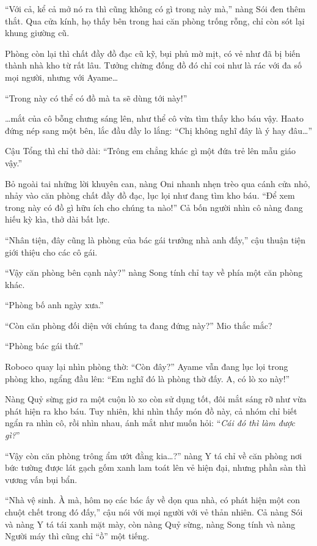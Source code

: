 \documentclass[../main.tex]{subfiles}
\begin{document}
``Với cả, kể cả mở nó ra thì cũng không có gì trong này mà,'' nàng Sói đen thêm thắt. Qua cửa kính, họ thấy bên trong hai căn phòng trống rỗng, chỉ còn sót lại khung giường cũ.

Phòng còn lại thì chất đầy đồ đạc cũ kỹ, bụi phủ mờ mịt, có vẻ như đã bị biến thành nhà kho từ rất lâu. Tưởng chừng đống đồ đó chỉ coi như là rác với đa số mọi người, nhưng với Ayame\dots

``Trong này có thể có đồ mà ta sẽ dùng tới này!''

\dots mắt của cô bỗng chưng sáng lên, như thể cô vừa tìm thấy kho báu vậy. Haato đứng nép sang một bên, lắc đầu đầy lo lắng: ``Chị không nghĩ đây là ý hay đâu\dots''

Cậu Tổng thì chỉ thở dài: ``Trông em chẳng khác gì một đứa trẻ lên mẫu giáo vậy.''

Bỏ ngoài tai những lời khuyên can, nàng Oni nhanh nhẹn trèo qua cánh cửa nhỏ, nhảy vào căn phòng chất đầy đồ đạc, lục lọi như đang tìm kho báu. ``Để xem trong này có đồ gì hữu ích cho chúng ta nào!'' Cả bốn người nhìn cô nàng đang hiếu kỳ kìa, thở dài bất lực.

``Nhân tiện, đây cũng là phòng của bác gái trưởng nhà anh đấy,'' cậu thuận tiện giới thiệu cho các cô gái.

``Vậy căn phòng bên cạnh này?'' nàng Song tính chỉ tay về phía một căn phòng khác.

``Phòng bố anh ngày xưa.''

``Còn căn phòng đối diện với chúng ta đang đứng này?'' Mio thắc mắc?

``Phòng bác gái thứ.''

Roboco quay lại nhìn phòng thờ: ``Còn đây?'' Ayame vẫn đang lục lọi trong phòng kho, ngẩng đầu lên: ``Em nghĩ đó là phòng thờ đấy. A, có lò xo này!''

Nàng Quỷ sừng giơ ra một cuộn lò xo còn sử dụng tốt, đôi mắt sáng rỡ như vừa phát hiện ra kho báu. Tuy nhiên, khi nhìn thấy món đồ này, cả nhóm chỉ biết ngẩn ra nhìn cô, rồi nhìn nhau, ánh mắt như muốn hỏi: ``\textit{Cái đó thì làm được gì?}''

``Vậy còn căn phòng trông ẩm ướt đằng kia\dots?'' nàng Y tá chỉ về căn phòng nơi bức tường được lát gạch gốm xanh lam toát lên vẻ hiện đại, nhưng phần sàn thì vương vấn bụi bẩn.

``Nhà vệ sinh. À mà, hôm nọ các bác ấy về dọn qua nhà, có phát hiện một con chuột chết trong đó đấy,'' cậu nói với mọi người với vẻ thản nhiên. Cả nàng Sói và nàng Y tá tái xanh mặt mày, còn nàng Quỷ sừng, nàng Song tính và nàng Người máy thì cũng chỉ ``ồ'' một tiếng.
\end{document}
